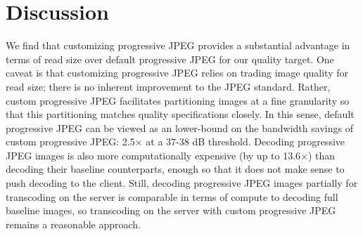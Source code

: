 \section{Discussion}
We find that customizing progressive JPEG provides a substantial advantage in terms of read size over default progressive JPEG for our quality target.
One caveat is that customizing progressive JPEG relies on trading image quality for read size; there is no inherent improvement to the JPEG standard.
Rather, custom progressive JPEG facilitates partitioning images at a fine granularity so that this partitioning matches quality specifications closely. 
In this sense, default progressive JPEG can be viewed as an lower-bound on the bandwidth savings of custom progressive JPEG: 2.5$\times$ at a 37-38 dB threshold.
Decoding progressive JPEG images is also more computationally expensive (by up to 13.6$\times$) than decoding their baseline counterparts, enough so that it does not make sense to push decoding to the client. 
Still, decoding progressive JPEG images partially for transcoding on the server is comparable in terms of compute to decoding full baseline images, so transcoding on the server with custom progressive JPEG remains a reasonable approach.

